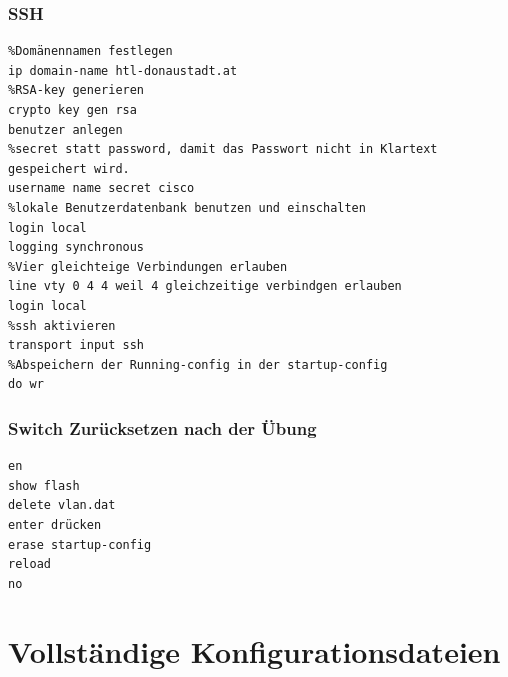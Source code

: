 \documentclass[a4paper]{article}
\begin{document}
\newpage

\subsubsection{SSH}
\begin{lstlisting}
%Domänennamen festlegen
ip domain-name htl-donaustadt.at
%RSA-key generieren
crypto key gen rsa
benutzer anlegen
%secret statt password, damit das Passwort nicht in Klartext gespeichert wird.
username name secret cisco
%lokale Benutzerdatenbank benutzen und einschalten
login local
logging synchronous
%Vier gleichteige Verbindungen erlauben
line vty 0 4 4 weil 4 gleichzeitige verbindgen erlauben
login local
%ssh aktivieren
transport input ssh
%Abspeichern der Running-config in der startup-config
do wr
\end{lstlisting}
\newpage
\subsubsection{Switch Zurücksetzen nach der Übung}
\begin{lstlisting}
en
show flash
delete vlan.dat
enter drücken
erase startup-config
reload
no
\end{lstlisting}
\section{Vollständige Konfigurationsdateien}
\end{document}
